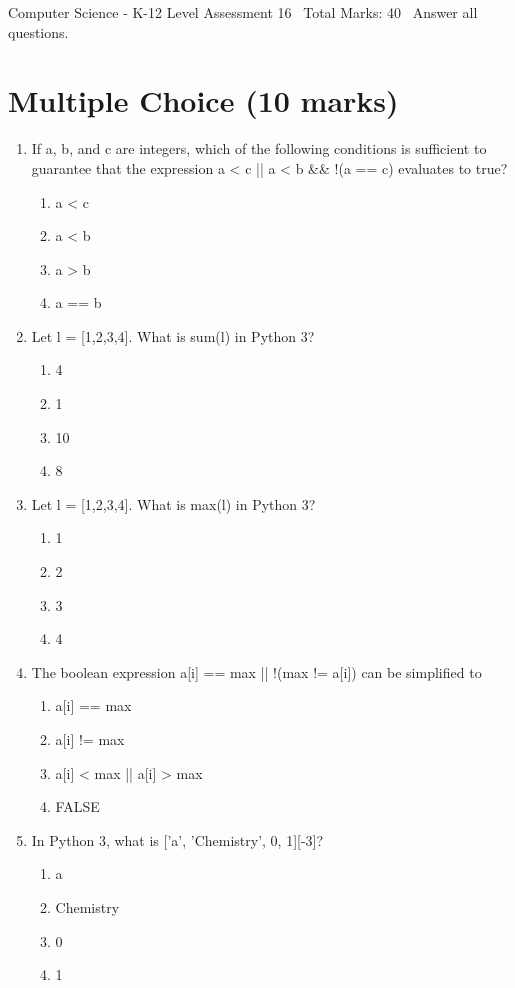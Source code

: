 \documentclass[12pt]{article}
\begin{document}
\begin{center}
Computer Science - K-12 Level Assessment 16 \
Total Marks: 40 \
Answer all questions.
\end{center}

\section*{Multiple Choice (10 marks)}
\begin{enumerate}[label=\arabic*.]
\item If a, b, and c are integers, which of the following conditions is sufficient to guarantee that the expression a \textless{} c || a \textless{} b \&\& !(a == c) evaluates to true?
\begin{enumerate}[label=(\alph*)]
    \item a \textless{} c
    \item a \textless{} b
    \item a \textgreater{} b
    \item a == b
\end{enumerate}
\item Let l = [1,2,3,4]. What is sum(l) in Python 3?
\begin{enumerate}[label=(\alph*)]
    \item 4
    \item 1
    \item 10
    \item 8
\end{enumerate}
\item Let l = [1,2,3,4]. What is max(l) in Python 3?
\begin{enumerate}[label=(\alph*)]
    \item 1
    \item 2
    \item 3
    \item 4
\end{enumerate}
\item The boolean expression a[i] == max || !(max != a[i]) can be simplified to
\begin{enumerate}[label=(\alph*)]
    \item a[i] == max
    \item a[i] != max
    \item a[i] \textless{} max || a[i] \textgreater{} max
    \item FALSE
\end{enumerate}
\item In Python 3, what is ['a', 'Chemistry', 0, 1][-3]?
\begin{enumerate}[label=(\alph*)]
    \item a
    \item Chemistry
    \item 0
    \item 1
\end{enumerate}
\end{enumerate}
\end{document}
